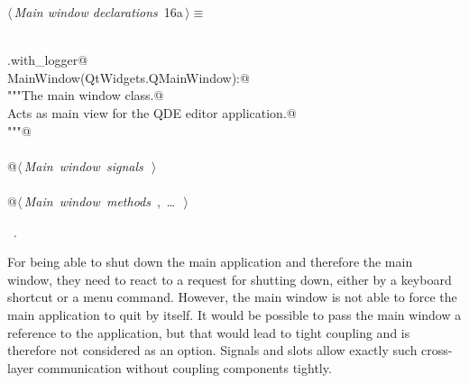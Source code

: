 \documentclass[
    a4paper,      %
    10pt,         %
    openright,    %
    notitlepage,  %
    parskip=half, %
]{scrreprt}       %
\theoremstyle{definition}                    %
\begin{document}
\begin{flushleft} \small
\begin{minipage}{\linewidth}\label{scrap5}\raggedright\small
{} $\langle\,${\itshape Main window declarations}\nobreak\ {\footnotesize {16a}}$\,\rangle\equiv$
\vspace{-1ex}
\begin{list}{}{} \item
\mbox{}\lstinline@@\\
\mbox{}\lstinline@common.with_logger@\\
\mbox{}\lstinline@class MainWindow(QtWidgets.QMainWindow):@\\
\mbox{}\lstinline@    """The main window class.@\\
\mbox{}\lstinline@    Acts as main view for the QDE editor application.@\\
\mbox{}\lstinline@    """@\\
\mbox{}\lstinline@@\\
\mbox{}\lstinline@    @\hbox{$\langle\,${\itshape Main window signals}\nobreak\ {\footnotesize {}}$\,\rangle$}\lstinline@@\\
\mbox{}\lstinline@@\\
\mbox{}\lstinline@    @\hbox{$\langle\,${\itshape Main window methods}\nobreak\ {\footnotesize {}, \ldots\ }$\,\rangle$}\lstinline@@\\
\mbox{}\lstinline@@{\NWsep}
\end{list}
\vspace{-1.5ex}
\footnotesize
\begin{list}{}{\setlength{\itemsep}{-\parsep}\setlength{\itemindent}{-\leftmargin}}
\item \NWtxtMacroRefIn\ .

\item{}
\end{list}
\end{minipage}\vspace{4ex}
\end{flushleft}
% 

For being able to shut down the main application and therefore the main window,
they need to react to a request for shutting down, either by a keyboard shortcut
or a menu command. However, the main window is not able to force the main
application to quit by itself. It would be possible to pass the main window a
reference to the application, but that would lead to tight coupling and is
therefore not considered as an option. Signals and slots allow exactly such
cross-layer communication without coupling components tightly.
\end{document}
